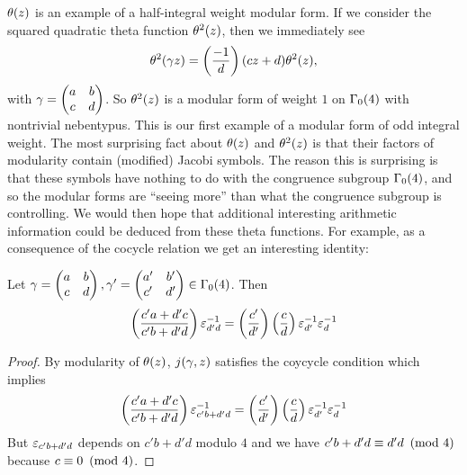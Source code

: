 \documentclass[12pt,oneside]{book}
\begin{document}
      $\theta(z)$ is an example of a half-integral weight modular form. If we consider the squared quadratic theta function $\theta^{2}(z)$, then we immediately see
      \[
        \theta^{2}(\gamma z) = \left(\frac{-1}{d}\right)(cz+d)\theta^{2}(z),
      \]
      with $\gamma = \begin{pmatrix} a & b \\ c & d \end{pmatrix}$. So $\theta^{2}(z)$ is a modular form of weight $1$ on $\Gamma_{0}(4)$ with nontrivial nebentypus. This is our first example of a modular form of odd integral weight. The most surprising fact about $\theta(z)$ and $\theta^{2}(z)$ is that their factors of modularity contain (modified) Jacobi symbols. The reason this is surprising is that these symbols have nothing to do with the congruence subgroup $\Gamma_{0}(4)$, and so the modular forms are ``seeing more'' than what the congruence subgroup is controlling. We would then hope that additional interesting arithmetic information could be deduced from these theta functions. For example, as a consequence of the cocycle relation we get an interesting identity:

      \begin{corollary}
        Let $\gamma = \begin{pmatrix} a & b \\ c & d \end{pmatrix},\gamma' = \begin{pmatrix} a' & b' \\ c' & d' \end{pmatrix} \in \Gamma_{0}(4)$. Then
        \[
          \left(\frac{c'a+d'c}{c'b+d'd}\right)\varepsilon_{d'd}^{-1} = \left(\frac{c'}{d'}\right)\left(\frac{c}{d}\right)\varepsilon_{d'}^{-1}\varepsilon_{d}^{-1}
        \]
      \end{corollary}
      \begin{proof}
        By modularity of $\theta(z)$, $j(\gamma,z)$ satisfies the coycycle condition which implies
        \[
          \left(\frac{c'a+d'c}{c'b+d'd}\right)\varepsilon_{c'b+d'd}^{-1} = \left(\frac{c'}{d'}\right)\left(\frac{c}{d}\right)\varepsilon_{d'}^{-1}\varepsilon_{d}^{-1}
        \]
        But $\varepsilon_{c'b+d'd}$ depends on $c'b+d'd$ modulo $4$ and we have $c'b+d'd \equiv d'd \ \left(\text{mod }4\right)$ because $c \equiv 0 \ \left(\text{mod }4\right)$.
      \end{proof}
\end{document}
